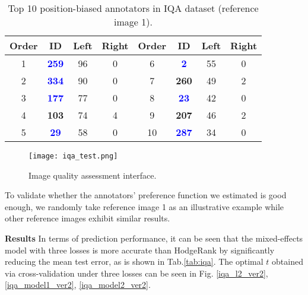 \documentclass[10pt,journal,cspaper,compsoc]{IEEEtran}
\begin{document}
{{\renewcommand\baselinestretch{1.1}\selectfont
\setlength{\belowcaptionskip}{0pt}
\begin{table}[h]\caption{\label{tab:ref1} Top 10 position-biased annotators in IQA dataset (reference image 1).}
\tiny
\centering
\begin{lrbox}{\tablebox}
\begin{tabular}{||c|c|c|c||c|c|c|c||}
  \hline  \textbf{Order} &\textbf{ID}   &\textbf{Left}  &\textbf{Right} & \textbf{Order} & \textbf{ID}   &\textbf{Left}  &\textbf{Right} \\
 \hline
 \hline  1 & \textcolor{blue}{\textbf{259}}    &96     &0  & 6 & \textcolor{blue}{\textbf{2}}   &55     &0 \\
\hline  2 & \textcolor{blue}{\textbf{334}}     &90    & 0  & 7 & \textbf{260}    & 49     &2\\
 \hline  3 & \textcolor{blue}{\textbf{177}}   &77     &0   & 8 & \textcolor{blue}{\textbf{23}}    &42     &0 \\
 \hline 4 & \textbf{103}  &74     &4  &9  & \textbf{207}    &46     &2\\
 \hline 5 & \textcolor{blue}{\textbf{29}}  &58     &0  & 10 & \textcolor{blue}{\textbf{287}}   &34     &0\\



 \hline
\end {tabular}
\medskip
\end{lrbox}
\scalebox{1}{\usebox{\tablebox}}
\end{table}
\par}

\begin{figure}[h]
 \begin{center}
\texttt{[image: iqa\_test.png]}
  \caption{Image quality assessment interface.} \label{iqa_test}
\end{center}
\end{figure}

To validate whether the annotators' preference function we estimated is good enough, we randomly take
reference image 1 as an illustrative example while other reference
images exhibit similar results.

\textbf{Results} In terms of prediction performance, it can be seen that the mixed-effects model with three losses is more accurate than HodgeRank by significantly reducing the mean test error, as is shown in Tab.\ref{tab:iqa}. The optimal $t$ obtained via cross-validation under three losses can be seen in
Fig. \ref{iqa_l2_ver2}, \ref{iqa_model1_ver2}, \ref{iqa_model2_ver2}.

}
\end{document}
